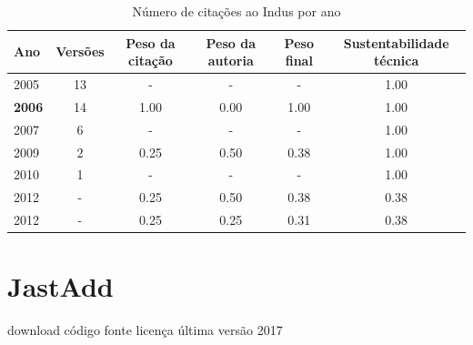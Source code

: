 \begin{table}[H]
\caption{Número de citações ao Indus por ano}
\centering
\begin{tabular}{| l | c | c | c | c | c |}
  \hline
  Ano & Versões & Peso da citação & Peso da autoria & Peso final & Sustentabilidade técnica \\
  \hline
        2005 & 13 & - & - & -
        &
          {\color{blue} 1.00}
        \\
\hline
            {\bf 2006}
          &
          14
          &
          1.00
          &
          0.00
          &
          1.00
          &
            {\color{blue} 1.00}
          \\
\hline
        2007 & 6 & - & - & -
        &
          {\color{blue} 1.00}
        \\
\hline
            2009
          &
          2
          &
          0.25
          &
          0.50
          &
          0.38
          &
            {\color{blue} 1.00}
          \\
\hline
        2010 & 1 & - & - & -
        &
          {\color{blue} 1.00}
        \\
\hline
            2012
          &
          -
          &
          0.25
          &
          0.50
          &
          0.38
          &
            {\color{red} 0.38}
          \\
            2012
          &
          -
          &
          0.25
          &
          0.25
          &
          0.31
          &
            {\color{red} 0.38}
          \\
\hline
\end{tabular}
\end{table}



\section{JastAdd}
\checkmark download
\checkmark código fonte
\checkmark licença
\checkmark última versão 2017


